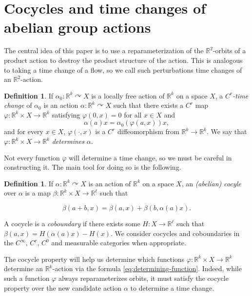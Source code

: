 \documentclass[12pt]{amsart}
\theoremstyle{definition}
\newtheorem{definition}[theorem]{Definition}
\theoremstyle{remark}
\numberwithin{equation}{section}
\newcommand{\R}{\mathbb{R}}
\newtheorem{Structural Stability Theorem}[theorem]{Structural Stability Theorem}
\begin{document}
\section{Cocycles and time changes of abelian group actions}

The central idea of this paper is to use a reparameterization of the $\R^2$-orbits of a product action to destroy the product structure of the action. This is analogous to taking a time change of a flow, so we call such perturbations time changes of an $\R^2$-action.


\begin{definition}
If $\alpha_0 : \R^k \curvearrowright X$ is a { locally free} action of $\R^k$ on a space $X$, a {\it $C^r$-time change} of $\alpha_0$ is an action $\alpha : \R^k \curvearrowright X$ such that there exists a $C^r$ map $\varphi :  \R^k \times X \to \R^k$ satisfying { $\varphi(0,x)= 0$ for all $x \in X$ and}
\begin{equation}
\label{eq:determining-function}
 \alpha(a)x = \alpha_0(\varphi(a,x))x,
 \end{equation}
and for every $x \in X$, $\varphi(\cdot ,x)$ is a $C^r$ diffeomorphism from $\R^k \to \R^k$. We say that $\varphi : \R^k \times X \to \R^k$ {\it determines} $\alpha$.
\end{definition}

Not every function $\varphi$ will determine a time change, so we must be careful in constructing it. The main tool for doing so is the following.

\begin{definition}
If $\alpha : \R^k \curvearrowright X$ is an action of $\R^k$ on a space $X$, an {\it (abelian) cocyle} over $\alpha$ is a map $\beta : \R^k \times X \to \R^\ell$ such that

\begin{equation}
\label{eq:cocycle-eqn}
\beta(a+b,x) = \beta(a,x) + \beta(b,\alpha(a)x).
\end{equation}

A cocycle is a {\it coboundary} if there exists some $H : X \to \R^\ell$ such that $\beta(a,x) = H({ \alpha(a)}x) - H(x)$. We consider cocycles and coboundaries in the $C^\infty$, $C^r$, $C^0$ and measurable categories when appropriate. 
\end{definition}

The cocycle property will help us determine which functions $\varphi : \R^k \times X \to \R^k$ determine an $\R^k$-action via the formula \eqref{eq:determining-function}. Indeed, while such a function $\varphi$ always reparameterizes orbits, it must satisfy the cocycle property over the new candidate action $\alpha$ to determine a time change.
\end{document}
